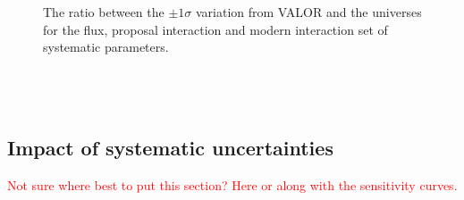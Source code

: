 \begin{figure}[h!]
    \vspace{0.1\textwidth}
  \captionsetup{width=0.45\textwidth}
  \parbox[b]{0.45\textwidth}%
  {
   \caption[The ratio between the $\pm 1 \sigma$ variation from VALOR. and the universes for the flux, proposal interaction and modern interaction set of systematics.]{The ratio between the $\pm 1 \sigma$ variation from VALOR and the universes for the flux, proposal interaction and modern interaction set of systematic parameters.  \\\phantom{.}\\\phantom{.}\\\phantom{.}\\
   \label{fig:1sigma_variations_toys}}
  }
\end{figure}

\clearpage
\subsection{Impact of systematic uncertainties}

\textcolor{red}{Not sure where best to put this section? Here or along with the sensitivity curves.}

